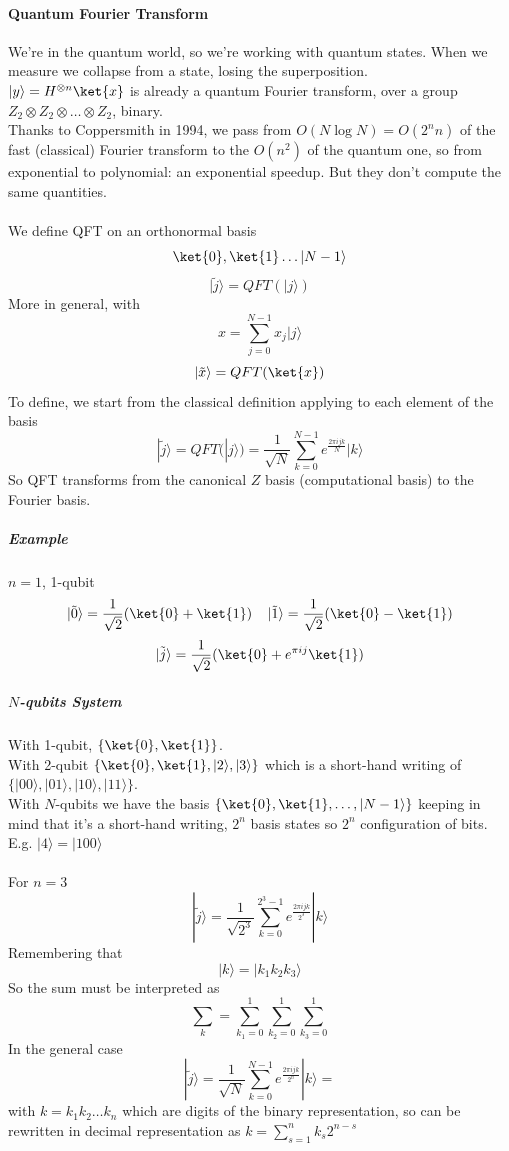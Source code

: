 \documentclass[10pt]{report}
\begin{document}
\paragraph{Quantum Fourier Transform} We're in the quantum world, so we're working with quantum states. When we measure we collapse from a state, losing the superposition.\\
$|y\rangle = H^{\otimes n}\ket{x}$ is already a quantum Fourier transform, over a group $Z_2\otimes Z_2\otimes\ldots\otimes Z_2$, binary.\\
Thanks to Coppersmith in 1994, we pass from $O(N\log N) = O(2^n n)$ of the fast (classical) Fourier transform to the $O(n^2)$ of the quantum one, so from exponential to polynomial: an exponential speedup. But they don't compute the same quantities.\\\\
We define QFT on an orthonormal basis $$\ket{0},\ket{1}\ldots|N-1\rangle$$
$$|\tilde{j}\rangle = QFT(|j\rangle)$$
More in general, with $$x=\sum_{j=0}^{N-1} x_j|j\rangle$$ $$|\tilde{x}\rangle = QFT(\ket{x})$$
To define, we start from the classical definition applying to each element of the basis
$$|\tilde{j}\rangle = QFT(|j\rangle) = \frac{1}{\sqrt{N}}\sum_{k=0}^{N-1} e^{\frac{2\pi ijk}{N}}|k\rangle$$
So QFT transforms from the canonical $Z$ basis (computational basis) to the Fourier basis.
\subparagraph{Example} $n=1$, 1-qubit
$$|\tilde{0}\rangle=\frac{1}{\sqrt{2}}(\ket{0}+\ket{1})\:\:\:\:\:|\tilde{1}\rangle=\frac{1}{\sqrt{2}}(\ket{0}-\ket{1})$$
$$|\tilde{j}\rangle=\frac{1}{\sqrt{2}}(\ket{0}+e^{\pi ij}\ket{1})$$
\subparagraph{$N$-qubits System}
With 1-qubit, $\{\ket{0},\ket{1}\}$.\\
With 2-qubit $\{\ket{0},\ket{1},|2\rangle,|3\rangle\}$ which is a short-hand writing of $\{|00\rangle,|01\rangle,|10\rangle,|11\rangle\}$.\\
With $N$-qubits we have the basis $\{\ket{0},\ket{1},\ldots,|N-1\rangle\}$ keeping in mind that it's a short-hand writing, $2^n$ basis states so $2^n$ configuration of bits.\\E.g. $|4\rangle = |100\rangle$\\\\
For $n=3$ $$|\tilde{j}\rangle = \frac{1}{\sqrt{2^3}}\sum_{k=0}^{2^3-1}e^{\frac{2\pi ijk}{2^3}}|k\rangle$$
Remembering that
$$|k\rangle=|k_1k_2k_3\rangle$$
So the sum must be interpreted as $$\sum_k = \sum_{k_1=0}^1\sum_{k_2=0}^1\sum_{k_3=0}^1$$
In the general case
$$|\tilde{j}\rangle = \frac{1}{\sqrt{N}}\sum_{k=0}^{N-1}e^{\frac{2\pi ijk}{2^n}}|k\rangle =$$
with $k=k_1k_2\ldots k_n$ which are digits of the binary representation, so can be rewritten in decimal representation as $k = \sum_{s=1}^n k_s2^{n-s}$
\end{document}
